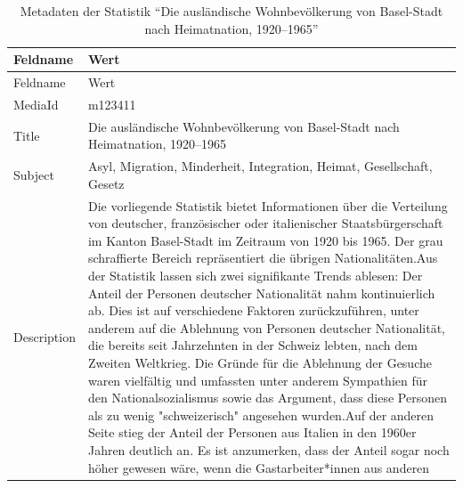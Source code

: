 \documentclass[
  nswissgerman,
  letterpaper,
  DIV=11,
  numbers=noendperiod]{scrartcl}
\begin{document}
\begin{longtable}[]{@{}
  >{\raggedright\arraybackslash}p{}
  >{\raggedright\arraybackslash}p{}@{}}
\caption{Metadaten der Statistik ``Die ausländische Wohnbevölkerung von
Basel-Stadt nach Heimatnation,
1920--1965''}\label{tbl-metadaten-die-auslaendische-wohnbevoelkerung-von-basel-stadt-nach-heimatnation-1920-1965}\tabularnewline
\toprule\noalign{}
\begin{minipage}[b]{\linewidth}\raggedright
Feldname
\end{minipage} & \begin{minipage}[b]{\linewidth}\raggedright
Wert
\end{minipage} \\
\midrule\noalign{}
\endfirsthead
\toprule\noalign{}
\begin{minipage}[b]{\linewidth}\raggedright
Feldname
\end{minipage} & \begin{minipage}[b]{\linewidth}\raggedright
Wert
\end{minipage} \\
\midrule\noalign{}
\endhead
\bottomrule\noalign{}
\endlastfoot
MediaId & m123411 \\
Title & Die ausländische Wohnbevölkerung von Basel-Stadt nach
Heimatnation, 1920--1965 \\
Subject & Asyl, Migration, Minderheit, Integration, Heimat,
Gesellschaft, Gesetz \\
Description & Die vorliegende Statistik bietet Informationen über die
Verteilung von deutscher, französischer oder italienischer
Staatsbürgerschaft im Kanton Basel-Stadt im Zeitraum von 1920 bis 1965.
Der grau schraffierte Bereich repräsentiert die übrigen
Nationalitäten.Aus der Statistik lassen sich zwei signifikante Trends
ablesen: Der Anteil der Personen deutscher Nationalität nahm
kontinuierlich ab. Dies ist auf verschiedene Faktoren zurückzuführen,
unter anderem auf die Ablehnung von Personen deutscher Nationalität, die
bereits seit Jahrzehnten in der Schweiz lebten, nach dem Zweiten
Weltkrieg. Die Gründe für die Ablehnung der Gesuche waren vielfältig und
umfassten unter anderem Sympathien für den Nationalsozialismus sowie das
Argument, dass diese Personen als zu wenig "schweizerisch" angesehen
wurden.Auf der anderen Seite stieg der Anteil der Personen aus Italien
in den 1960er Jahren deutlich an. Es ist anzumerken, dass der Anteil
sogar noch höher gewesen wäre, wenn die Gastarbeiter*innen aus anderen

\end{longtable}
\end{document}
